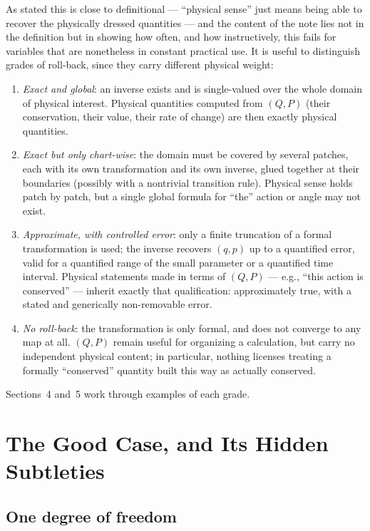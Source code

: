 \documentclass[11pt]{article}
\begin{document}
As stated this is close to definitional --- ``physical sense'' just means being able to recover the physically dressed quantities --- and the content of the note lies not in the definition but in showing how often, and how instructively, this fails for variables that are nonetheless in constant practical use. It is useful to distinguish grades of roll-back, since they carry different physical weight:
\begin{enumerate}[label=(\alph*)]
\item \emph{Exact and global}: an inverse exists and is single-valued over the whole domain of physical interest. Physical quantities computed from $(Q,P)$ (their conservation, their value, their rate of change) are then exactly physical quantities.
\item \emph{Exact but only chart-wise}: the domain must be covered by several patches, each with its own transformation and its own inverse, glued together at their boundaries (possibly with a nontrivial transition rule). Physical sense holds patch by patch, but a single global formula for ``the'' action or angle may not exist.
\item \emph{Approximate, with controlled error}: only a finite truncation of a formal transformation is used; the inverse recovers $(q,p)$ up to a quantified error, valid for a quantified range of the small parameter or a quantified time interval. Physical statements made in terms of $(Q,P)$ --- e.g., ``this action is conserved'' --- inherit exactly that qualification: approximately true, with a stated and generically non-removable error.
\item \emph{No roll-back}: the transformation is only formal, and does not converge to any map at all. $(Q,P)$ remain useful for organizing a calculation, but carry no independent physical content; in particular, nothing licenses treating a formally ``conserved'' quantity built this way as actually conserved.
\end{enumerate}
Sections~4 and~5 work through examples of each grade.

\section{The Good Case, and Its Hidden Subtleties}

\subsection{One degree of freedom}
\end{document}
